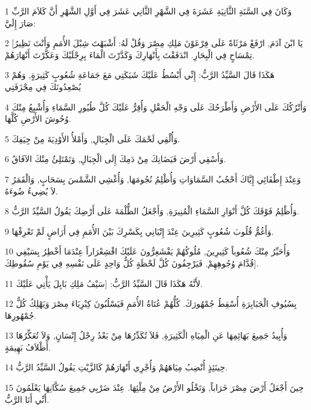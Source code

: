 \par 1 وَكَانَ فِي السَّنَةِ الثَّانِيَةِ عَشَرَةَ فِي الشَّهْرِ الثَّانِي عَشَرَ فِي أَوَّلِ الشَّهْرِ أَنَّ كَلاَمَ الرَّبِّ صَارَ إِلَيَّ:
\par 2 [يَا ابْنَ آدَمَ, ارْفَعْ مَرْثَاةً عَلَى فِرْعَوْنَ مَلِكِ مِصْرَ وَقُلْ لَهُ: أَشْبَهْتَ شِبْلَ الأُمَمِ وَأَنْتَ نَظِيرُ تِمْسَاحٍ فِي الْبِحَارِ. انْدَفَقْتَ بِأَنْهَارِكَ وَكَدَّرْتَ الْمَاءَ بِرِجْلَيْكَ وَعَكَّرْتَ أَنْهَارَهُمْ.
\par 3 هَكَذَا قَالَ السَّيِّدُ الرَّبُّ: إِنِّي أَبْسُطُ عَلَيْكَ شَبَكَتِي مَعَ جَمَاعَةِ شُعُوبٍ كَثِيرَةٍ, وَهُمْ يُصْعِدُونَكَ فِي مِجْزَفَتِي
\par 4 وَأَتْرُكُكَ عَلَى الأَرْضِ وَأَطْرَحُكَ عَلَى وَجْهِ الْحَقْلِ وَأُقِرُّ عَلَيْكَ كُلَّ طُيُورِ السَّمَاءِ وَأُشْبِعُ مِنْكَ وُحُوشَ الأَرْضِ كُلَّهَا.
\par 5 وَأُلْقِي لَحْمَكَ عَلَى الْجِبَالِ, وَأَمْلأُ الأَوْدِيَةَ مِنْ جِيَفِكَ.
\par 6 وَأَسْقِي أَرْضَ فَيَضَانِكَ مِنْ دَمِكَ إِلَى الْجِبَالِ, وَتَمْتَلِئُ مِنْكَ الآفَاقُ.
\par 7 وَعِنْدَ إِطْفَائِي إِيَّاكَ أَحْجُبُ السَّمَاوَاتِ وَأُظْلِمُ نُجُومَهَا, وَأُغْشِي الشَّمْسَ بِسَحَابٍ, وَالْقَمَرُ لاَ يُضِيءُ ضُوءَهُ.
\par 8 وَأُظْلِمُ فَوْقَكَ كُلَّ أَنْوَارِ السَّمَاءِ الْمُنِيرَةِ, وَأَجْعَلُ الظُّلْمَةَ عَلَى أَرْضِكَ يَقُولُ السَّيِّدُ الرَّبُّ.
\par 9 وَأَغُمُّ قُلُوبَ شُعُوبٍ كَثِيرِينَ عِنْدَ إِتْيَانِي بِكَسْرِكَ بَيْنَ الأُمَمِ فِي أَرَاضٍ لَمْ تَعْرِفْهَا.
\par 10 وَأُحَيِّرُ مِنْكَ شُعُوباً كَثِيرِينَ, مُلُوكُهُمْ يَقْشَعِرُّونَ عَلَيْكَ اقْشِعْرَاراً عِنْدَمَا أَخْطِرُ بِسَيْفِي قُدَّامَ وُجُوهِهِمْ, فَيَرْجِفُونَ كُلَّ لَحْظَةٍ كُلُّ وَاحِدٍ عَلَى نَفْسِهِ فِي يَوْمِ سُقُوطِكَ].
\par 11 لأَنَّهُ هَكَذَا قَالَ السَّيِّدُ الرَّبُّ: [سَيْفُ مَلِكِ بَابِلَ يَأْتِي عَلَيْكَ.
\par 12 بِسُيُوفِ الْجَبَابِرَةِ أُسْقِطُ جُمْهُورَكَ. كُلُّهُمْ عُتَاةُ الأُمَمِ فَيَسْلُبُونَ كِبْرِيَاءَ مِصْرَ وَيَهْلِكُ كُلُّ جُمْهُورِهَا.
\par 13 وَأُبِيدُ جَمِيعَ بَهَائِمِهَا عَنِ الْمِيَاهِ الْكَثِيرَةِ, فَلاَ تُكَدِّرُهَا مِنْ بَعْدُ رِجْلُ إِنْسَانٍ, وَلاَ تُعَكِّرُهَا أَظْلاَفُ بَهِيمَةٍ.
\par 14 حِينَئِذٍ أُنْضِبُ مِيَاهَهُمْ وَأُجْرِي أَنْهَارَهُمْ كَالزَّيْتِ يَقُولُ السَّيِّدُ الرَّبُّ.
\par 15 حِينَ أَجْعَلُ أَرْضَ مِصْرَ خَرَاباً, وَتَخْلُو الأَرْضُ مِنْ مِلْئِهَا. عِنْدَ ضَرْبِي جَمِيعَ سُكَّانِهَا يَعْلَمُونَ أَنِّي أَنَا الرَّبُّ.
